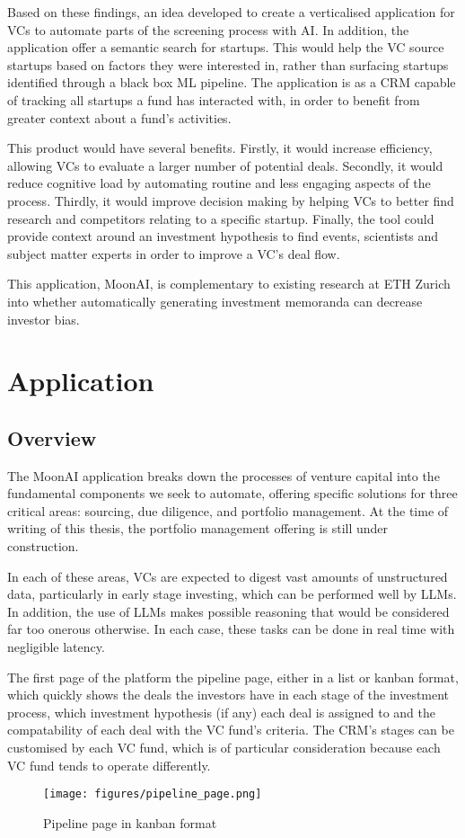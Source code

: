 \documentclass[a4paper, oneside]{discothesis}
\begin{document}
Based on these findings, an idea developed to create a verticalised application for VCs to automate parts of the screening process with AI. In addition, the application offer a semantic search for startups. This would help the VC source startups based on factors they were interested in, rather than surfacing startups identified through a black box ML pipeline. The application is as a CRM capable of tracking all startups a fund has interacted with, in order to benefit from greater context about a fund's activities.

This product would have several benefits. Firstly, it would increase efficiency, allowing VCs to evaluate a larger number of potential deals. Secondly, it would reduce cognitive load by automating routine and less engaging aspects of the process. Thirdly, it would improve decision making by helping VCs to better find research and competitors relating to a specific startup. Finally, the tool could provide context around an investment hypothesis to find events, scientists and subject matter experts in order to improve a VC's deal flow. 

This application, MoonAI, is complementary to existing research at ETH Zurich into whether automatically generating investment memoranda can decrease investor bias. 

\section{Application}
\subsection{Overview}

The MoonAI application breaks down the processes of venture capital into the fundamental components we seek to automate, offering specific solutions for three critical areas: sourcing, due diligence, and portfolio management. At the time of writing of this thesis, the portfolio management offering is still under construction.

In each of these areas, VCs are expected to digest vast amounts of unstructured data, particularly in early stage investing,  which can be performed well by LLMs. In addition, the use of LLMs makes possible reasoning that would be considered far too onerous otherwise. In each case, these tasks can be done in real time with negligible latency.

The first page of the platform the pipeline page, either in a list or kanban format, which quickly shows the deals the investors have in each stage of the investment process, which investment hypothesis (if any) each deal is assigned to and the compatability of each deal with the VC fund's criteria. The CRM's stages can be customised by each VC fund, which is of particular consideration because each VC fund tends to operate differently.
\begin{figure}[h]
    \centering
    \texttt{[image: figures/pipeline\_page.png]}
    \caption{Pipeline page in kanban format}
    \label{fig:pipeline_page}
\end{figure}
\end{document}
